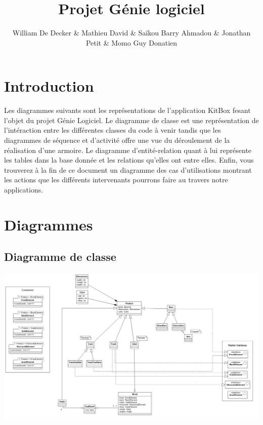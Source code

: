 \documentclass{ecam}
\begin{document}
\title{Projet Génie logiciel \\\vspace{10pt}\fontsize{30pt}{60pt}\selectfont{KitBox}}
\author{William De Decker \& Mathieu David \& Saïkou Barry Ahmadou \linebreak \& Jonathan Petit \& Momo Guy Donatien}
\maketitle

\chapter{Introduction}
Les diagrammes suivants sont les représentations de l'application KitBox fesant l'objet du projet Génie Logiciel. Le diagramme de classe est une représentation de l'intéraction entre les différentes classes du code à venir tandis que les diagrammes de séquence et d'activité offre une vue du déroulement de la réalisation d'une armoire.
Le diagramme d'entité-relation quant à lui représente les tables dans la base donnée et les relations qu'elles ont entre elles.
Enfin, vous trouverez à la fin de ce document un diagramme des cas d'utilisations montrant les actions que les différents intervenants pourrons faire au travers notre applications.


\pagebreak
\chapter{Diagrammes}

\section{Diagramme de classe}

\begin{center}

\includegraphics[angle=270,scale=0.3]{../images/class-diagram.png}
\end{center}
\end{document}
